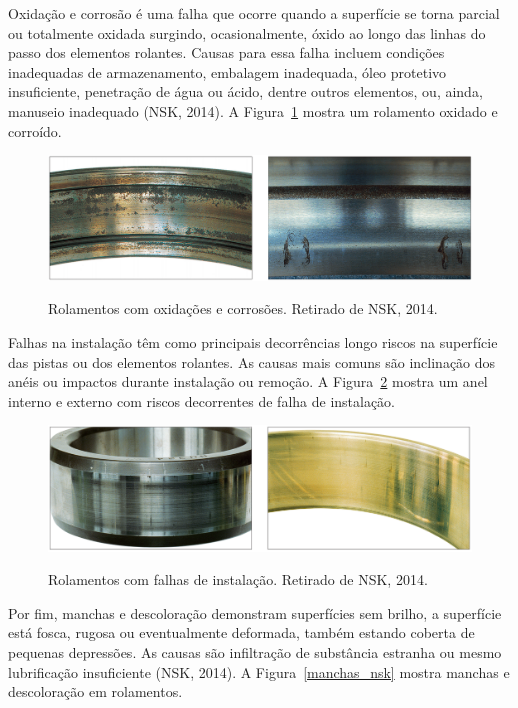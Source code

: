 \documentclass[
	12pt,				
	oneside,			
	a4paper,			
	english,			
	brazil,			
	]{abntex2ppgsi}
\begin{document}
Oxidação e corrosão é uma falha que ocorre quando a superfície se torna parcial ou totalmente oxidada surgindo, ocasionalmente, óxido ao longo das linhas do passo dos elementos rolantes. Causas para essa falha incluem condições inadequadas de armazenamento, embalagem inadequada, óleo protetivo insuficiente, penetração de água ou ácido, dentre outros elementos, ou, ainda, manuseio inadequado (NSK, 2014). A Figura~\ref{oxidacao_nsk} mostra um rolamento oxidado e corroído.

\begin{figure}[H]
\centering
\caption {Rolamentos com oxidações e corrosões. Retirado de NSK, 2014.}
\includegraphics[width=\textwidth,height=\textheight,keepaspectratio]{oxidacao_nsk}
\label{oxidacao_nsk}
\end{figure}

Falhas na instalação têm como principais decorrências longo riscos na superfície das pistas ou dos elementos rolantes. As causas mais comuns são inclinação dos anéis ou impactos durante instalação ou remoção. A Figura~\ref{falha_instalacao_nsk} mostra um anel interno e externo com riscos decorrentes de falha de instalação.

\begin{figure}[H]
\centering
\caption {Rolamentos com falhas de instalação. Retirado de NSK, 2014.}
\includegraphics[width=\textwidth,height=\textheight,keepaspectratio]{falha_instalacao_nsk}
\label{falha_instalacao_nsk}
\end{figure}

Por fim, manchas e descoloração demonstram superfícies sem brilho, a superfície está fosca, rugosa ou eventualmente deformada, também estando coberta de pequenas depressões. As causas são infiltração de substância estranha ou mesmo lubrificação insuficiente (NSK, 2014). A Figura~\ref{manchas_nsk} mostra manchas e descoloração em rolamentos.
\end{document}
